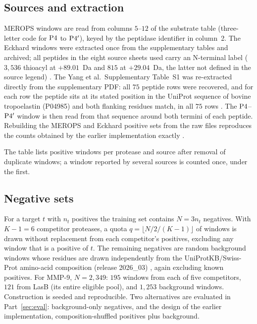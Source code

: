 \subsection{Sources and extraction}

MEROPS windows are read from columns $5$--$12$ of the substrate table
(three-letter code for $\mathrm{P}4$ to $\mathrm{P}4'$), keyed by the peptidase
identifier in column~2. The Eckhard windows were extracted once from the
supplementary tables and archived; all peptides in the eight source sheets
used carry an N-terminal label ($3{,}536$ thioacyl at $+89.01$~Da and $815$ at
$+29.04$~Da, the latter not defined in the source legend) \CONF. The Yang et
al.\ Supplementary Table~S1 was re-extracted directly from the supplementary
PDF: all $75$ peptide rows were recovered, and for each row the peptide sits at
its stated position in the UniProt sequence of bovine tropoelastin (P04985)
and both flanking residues match, in all $75$ rows \CONF. The $\mathrm{P}4$--$\mathrm{P}4'$
window is then read from that sequence around both termini of each peptide.
Rebuilding the MEROPS and Eckhard positive sets from the raw files reproduces
the counts obtained by the earlier implementation exactly \CONF.

\begin{center}
\small\renewcommand{\arraystretch}{1.25}

\end{center}

The table lists positive windows per protease and source after removal of
duplicate windows; a window reported by several sources is counted once, under
the first.

\subsection{Negative sets}

For a target $t$ with $n_t$ positives the training set contains
$N=3n_t$ negatives. With $K-1=6$ competitor proteases, a quota
$q=\lfloor N/2/(K-1)\rfloor$ of windows is drawn without replacement from each
competitor's positives, excluding any window that is a positive of $t$. The
remaining negatives are random background windows whose residues are drawn
independently from the UniProtKB/Swiss-Prot amino-acid composition (release
2026\_03) , again excluding known positives. For MMP-9, $N=2{,}349$:
$195$ windows from each of five competitors, $121$ from LasB (its entire
eligible pool), and $1{,}253$ background windows. Construction is seeded and
reproducible. Two alternatives are evaluated in Part~\ref{sec:eval}:
background-only negatives, and the design of the earlier implementation,
composition-shuffled positives plus background.

